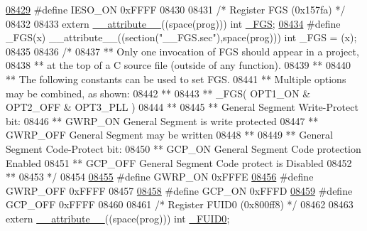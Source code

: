 \begin{DoxyCode}
{{{{\hypertarget{a00015_source_l08429}{}\hyperlink{a00015_ae5e524ce10c0264959925ccb98246055}{08429} \textcolor{preprocessor}{#define IESO\_ON              0xFFFF}
08430 
08431 \textcolor{comment}{/* Register FGS (0x157fa)                               */}
08432 
08433 \textcolor{keyword}{extern} \hyperlink{a00015_a493c46f03454991ccc5aa7a6e1dfb2a7}{\_\_attribute\_\_}((space(prog))) int \hyperlink{a00015_a39509b8a40f172708ac67db59ccf53da}{\_FGS};
\hypertarget{a00015_source_l08434}{}\hyperlink{a00015_a39509b8a40f172708ac67db59ccf53da}{08434} \textcolor{preprocessor}{#define \_FGS(x) \_\_attribute\_\_((section("\_\_FGS.sec"),space(prog))) int \_FGS = (x);}
08435 
08436 \textcolor{comment}{/*}
08437 \textcolor{comment}{** Only one invocation of FGS should appear in a project,}
08438 \textcolor{comment}{** at the top of a C source file (outside of any function).}
08439 \textcolor{comment}{**}
08440 \textcolor{comment}{** The following constants can be used to set FGS.}
08441 \textcolor{comment}{** Multiple options may be combined, as shown:}
08442 \textcolor{comment}{**}
08443 \textcolor{comment}{** \_FGS( OPT1\_ON & OPT2\_OFF & OPT3\_PLL )}
08444 \textcolor{comment}{**}
08445 \textcolor{comment}{**   General Segment Write-Protect bit:}
08446 \textcolor{comment}{**     GWRP\_ON              General Segment is write protected}
08447 \textcolor{comment}{**     GWRP\_OFF             General Segment may be written}
08448 \textcolor{comment}{**}
08449 \textcolor{comment}{**   General Segment Code-Protect bit:}
08450 \textcolor{comment}{**     GCP\_ON               General Segment Code protection Enabled}
08451 \textcolor{comment}{**     GCP\_OFF              General Segment Code protect is Disabled}
08452 \textcolor{comment}{**}
08453 \textcolor{comment}{*/}
08454 
\hypertarget{a00015_source_l08455}{}\hyperlink{a00015_a706a042b10cc342b4f782a8ddbba47a6}{08455} \textcolor{preprocessor}{#define GWRP\_ON              0xFFFE}
\hypertarget{a00015_source_l08456}{}\hyperlink{a00015_a499b7d150bcb8c5ea33ac73d01c4703c}{08456} \textcolor{preprocessor}{#define GWRP\_OFF             0xFFFF}
08457 
\hypertarget{a00015_source_l08458}{}\hyperlink{a00015_a87b73e82443697f5b246a5ac25eccb62}{08458} \textcolor{preprocessor}{#define GCP\_ON               0xFFFD}
\hypertarget{a00015_source_l08459}{}\hyperlink{a00015_a21ec329a371420b9f71f1c011d0e061f}{08459} \textcolor{preprocessor}{#define GCP\_OFF              0xFFFF}
08460 
08461 \textcolor{comment}{/* Register FUID0 (0x800ff8)                               */}
08462 
08463 \textcolor{keyword}{extern} \hyperlink{a00015_a493c46f03454991ccc5aa7a6e1dfb2a7}{\_\_attribute\_\_}((space(prog))) int \hyperlink{a00015_a8f1f7e736797ec125ac83da190ad1875}{\_FUID0};
}}}}
\end{DoxyCode}
